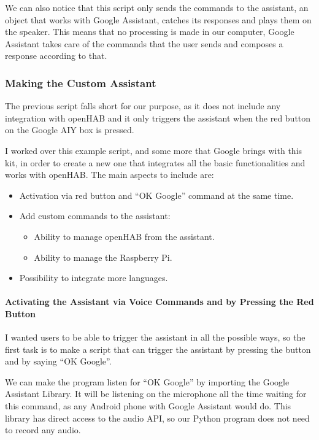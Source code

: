 We can also notice that this script only sends the commands to the assistant, an object that works with Google Assistant, catches
its responses and plays them on the speaker. This means that no processing is made in our computer, Google Assistant takes care
of the commands that the user sends and composes a response according to that.

\subsubsection{Making the Custom Assistant}
The previous script falls short for our purpose, as it does not include any integration with openHAB and it only triggers the
assistant when the red button on the Google AIY box is pressed.

I worked over this example script, and some more that Google brings with this kit, in order to create a new one that integrates
all the basic functionalities and works with openHAB. The main aspects to include are:
\begin{itemize}
    \item Activation via red button and “OK Google” command at the same time.
    \item Add custom commands to the assistant:
    \begin{itemize}
        \item Ability to manage openHAB from the assistant.
        \item Ability to manage the Raspberry Pi.
    \end{itemize}
    \item Possibility to integrate more languages.
\end{itemize}

\paragraph{Activating the Assistant via Voice Commands and by Pressing the Red Button}
I wanted users to be able to trigger the assistant in all the possible ways, so the first task is to make a script that can trigger
the assistant by pressing the button and by saying “OK Google”.

We can make the program listen for “OK Google” by importing the Google Assistant Library. It will be listening on the microphone
all the time waiting for this command, as any Android phone with Google Assistant would do. This library has direct access to the
audio API, so our Python program does not need to record any audio.


